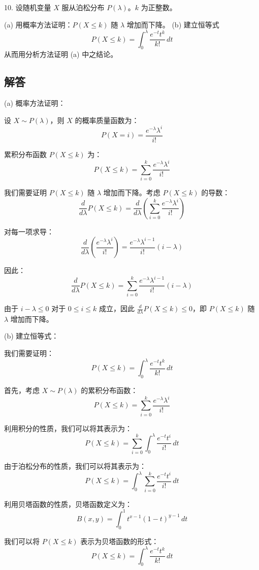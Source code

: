 \documentclass[UTF8]{report}
\theoremstyle{MyLineTheoremStyle} %
\theoremstyle{MyBlockTheoremStyle} %
\theoremstyle{MySubsubsectionStyle} %
\begin{document}
10. 设随机变量 \(X\) 服从泊松分布 \(P(\lambda)\)。\(k\) 为正整数。

(a) 用概率方法证明：\(P(X \leq k)\) 随 \(\lambda\) 增加而下降。
(b) 建立恒等式
\[
P(X \leq k) = \int_0^\lambda \frac{e^{-t} t^k}{k!} \, dt
\]
从而用分析方法证明 (a) 中之结论。

\subsection*{解答}

(a) 概率方法证明：

设 \(X \sim P(\lambda)\)，则 \(X\) 的概率质量函数为：
\[
P(X = i) = \frac{e^{-\lambda} \lambda^i}{i!}
\]

累积分布函数 \(P(X \leq k)\) 为：
\[
P(X \leq k) = \sum_{i=0}^k \frac{e^{-\lambda} \lambda^i}{i!}
\]

我们需要证明 \(P(X \leq k)\) 随 \(\lambda\) 增加而下降。考虑 \(P(X \leq k)\) 的导数：
\[
\frac{d}{d\lambda} P(X \leq k) = \frac{d}{d\lambda} \left( \sum_{i=0}^k \frac{e^{-\lambda} \lambda^i}{i!} \right)
\]

对每一项求导：
\[
\frac{d}{d\lambda} \left( \frac{e^{-\lambda} \lambda^i}{i!} \right) = \frac{e^{-\lambda} \lambda^{i-1}}{i!} (i - \lambda)
\]

因此：
\[
\frac{d}{d\lambda} P(X \leq k) = \sum_{i=0}^k \frac{e^{-\lambda} \lambda^{i-1}}{i!} (i - \lambda)
\]

由于 \(i - \lambda \leq 0\) 对于 \(0 \leq i \leq k\) 成立，因此 \(\frac{d}{d\lambda} P(X \leq k) \leq 0\)，即 \(P(X \leq k)\) 随 \(\lambda\) 增加而下降。

(b) 建立恒等式：

我们需要证明：
\[
P(X \leq k) = \int_0^\lambda \frac{e^{-t} t^k}{k!} \, dt
\]

首先，考虑 \(X \sim P(\lambda)\) 的累积分布函数：
\[
P(X \leq k) = \sum_{i=0}^k \frac{e^{-\lambda} \lambda^i}{i!}
\]

利用积分的性质，我们可以将其表示为：
\[
P(X \leq k) = \sum_{i=0}^k \int_0^\lambda \frac{e^{-t} t^i}{i!} \, dt
\]

由于泊松分布的性质，我们可以将其表示为：
\[
P(X \leq k) = \int_0^\lambda \sum_{i=0}^k \frac{e^{-t} t^i}{i!} \, dt
\]

利用贝塔函数的性质，贝塔函数定义为：
\[
B(x, y) = \int_0^1 t^{x-1} (1-t)^{y-1} \, dt
\]

我们可以将 \(P(X \leq k)\) 表示为贝塔函数的形式：
\[
P(X \leq k) = \int_0^\lambda \frac{e^{-t} t^k}{k!} \, dt
\]
\end{document}
